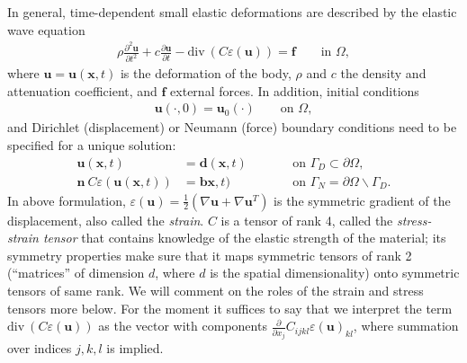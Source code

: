 \documentclass{article}
\renewcommand{\vec}[1]{\mathbf{#1}}
\renewcommand{\div}{\mathrm{div}\ }
\begin{document}
In general, time-dependent small elastic deformations are described by the
elastic wave equation
\begin{gather*}
  \rho \frac{\partial^2 \vec u}{\partial t^2} 
  + c \frac{\partial \vec u}{\partial t}
  - \div ( C \varepsilon(\vec u)) = \vec f
  \qquad
  \text{in $\Omega$},
\end{gather*}
where $\vec u=\vec u (\vec x,t)$ is the deformation of the body, $\rho$
and $c$ the density and attenuation coefficient, and $\vec f$ external forces.
In addition, initial conditions
\begin{align*}
  \vec u(\cdot, 0) = \vec u_0(\cdot)
  \qquad
  \text{on $\Omega$},
\end{align*}
and Dirichlet (displacement) or Neumann (force) boundary conditions need
to be specified for a unique solution:
\begin{align*}
  \vec u(\vec x,t) &= \vec d(\vec x,t)
  \qquad
  &&\text{on $\Gamma_D\subset\partial\Omega$},  
  \\
  \vec n \ C \varepsilon(\vec u(\vec x,t)) &= \vec b\vec x,t)
  \qquad
  &&\text{on $\Gamma_N=\partial\Omega\backslash\Gamma_D$}.
\end{align*}
In above formulation, $\varepsilon(\vec u)= \tfrac 12 (\nabla \vec u + \nabla
\vec u^T)$ is the symmetric gradient of the displacement, also called the
\textit{strain}. $C$ is a tensor of rank 4, called the \textit{stress-strain
  tensor} that contains knowledge of the elastic strength of the material; its
symmetry properties make sure that it maps symmetric tensors of rank 2
(``matrices'' of dimension $d$, where $d$ is the spatial dimensionality) onto
symmetric tensors of same rank. We will comment on the roles of the strain and
stress tensors more below. For the moment it suffices to say that we interpret
the term $\div ( C \varepsilon(\vec u))$ as the vector with components $\tfrac
\partial{\partial x_j} C_{ijkl} \varepsilon(\vec u)_{kl}$, where summation
over indices $j,k,l$ is implied.
\end{document}
